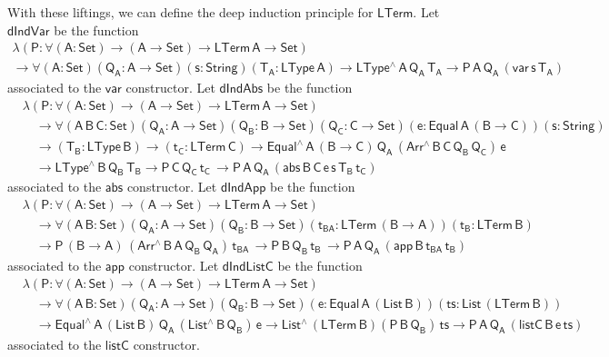 \documentclass[9pt]{entcs} \usepackage{entcsmacro}
\begin{document}
With these liftings, we can define the deep induction principle for $\mathsf{LTerm}$.
Let $\mathsf{dIndVar}$ be the function 
\begin{multline*}
\mathsf{\lambda (P : \forall (A : Set) \to (A \to Set) \to LTerm\,A \to Set)} \\
\mathsf{\to 
  \forall (A : Set) (Q_A : A \to Set) (s : String) (T_A : LType\, A) 
  \to LType^{\wedge} \, A\, Q_A\, T_A
  \to P \, A\, Q_A\, (var \, s\, T_A)
  }
\end{multline*}
associated to the $\mathsf{var}$ constructor. 
Let $\mathsf{dIndAbs}$ be the function 
\begin{align*}
  &\mathsf{\lambda (P : \forall (A : Set) \to (A \to Set) \to LTerm\,A \to Set)} \\
  &\quad\mathsf{\to 
  \forall (A\,B\,C: Set) (Q_A : A \to Set)  (Q_B : B \to Set) (Q_C : C \to Set)
  (e : Equal\, A\, (B \to C)) (s : String) } \\ 
  &\quad\mathsf{ \to (T_B : LType\, B) \to (t_C : LTerm\, C)
  \to Equal^{\wedge}\,A\,(B \to C)\, Q_A \, (Arr^{\wedge} \, B\, C\, Q_B \, Q_C) \, e
  } \\
  &\quad\mathsf{
  \to LType^{\wedge}\, B\, Q_B\, T_B
  \to P\, C\, Q_C\, t_C\, 
  \to P \, A\, Q_A\, (abs \,B \,C \, e \,s \,T_B \, t_C)
  }
\end{align*}
associated to the $\mathsf{abs}$ constructor. 
Let $\mathsf{dIndApp}$ be the function 
\begin{align*}
  &\mathsf{\lambda (P : \forall (A : Set) \to (A \to Set) \to LTerm\,A \to Set)} \\
  &\quad \mathsf{\to 
  \forall (A \,B : Set) (Q_A : A \to Set)  (Q_B : B \to Set) 
   (t_{BA} : LTerm\, (B \to A)) (t_B : LTerm\, B)} \\
  &\quad \mathsf{
  \to P\, (B \to A)\, (Arr^{\wedge} \, B\, A\, Q_B \, Q_A) \, t_{BA} \, 
  \to P\, B\, Q_B\, t_B\, 
  \to P \, A\, Q_A\, (app \,B \,t_{BA} \, t_B) }
\end{align*}
associated to the $\mathsf{app}$ constructor. 
Let $\mathsf{dIndListC}$ be the function 
\begin{align*}
  &\mathsf{\lambda (P : \forall (A : Set) \to (A \to Set) \to LTerm\,A \to Set)} \\
  &\quad \mathsf{\to 
  \forall (A \,B : Set) (Q_A : A \to Set)  (Q_B : B \to Set) 
    (e : Equal\, A\, (List\, B)) (ts : List\, (LTerm\, B))} \\ 
  &\quad \mathsf{
    \to Equal^{\wedge}\, A\, (List\,B)\, Q_A\, (List^{\wedge}\, B\, Q_B)\, e 
  \to List^{\wedge}\, (LTerm\,B) (P\, B\, Q_B)\, ts
  \to P \, A\, Q_A\, (listC \,B \,e \, ts) }
\end{align*}
associated to the $\mathsf{listC}$ constructor.
\end{document}
